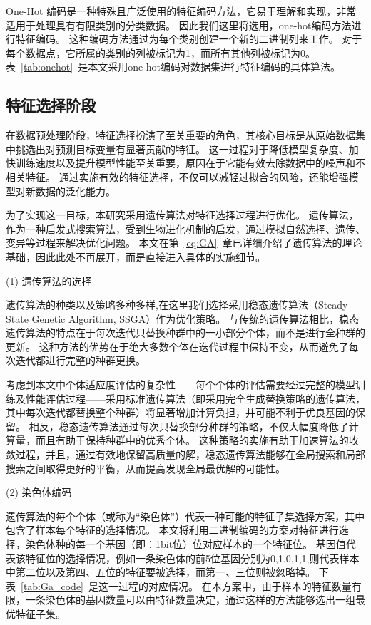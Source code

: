 One-Hot 编码是一种特殊且广泛使用的特征编码方法，它易于理解和实现，非常适用于处理具有有限类别的分类数据。
因此我们这里将选用，one-hot编码方法进行特征编码。
这种编码方法通过为每个类别创建一个新的二进制列来工作。
对于每个数据点，它所属的类别的列被标记为1，而所有其他列被标记为0。
表~\ref{tab:onehot}~是本文采用one-hot编码对数据集进行特征编码的具体算法。


\subsection{特征选择阶段}
在数据预处理阶段，特征选择扮演了至关重要的角色，其核心目标是从原始数据集中挑选出对预测目标变量有显著贡献的特征。
这一过程对于降低模型复杂度、加快训练速度以及提升模型性能至关重要，原因在于它能有效去除数据中的噪声和不相关特征。
通过实施有效的特征选择，不仅可以减轻过拟合的风险，还能增强模型对新数据的泛化能力。

为了实现这一目标，本研究采用遗传算法对特征选择过程进行优化。
遗传算法，作为一种启发式搜索算法，受到生物进化机制的启发，通过模拟自然选择、遗传、变异等过程来解决优化问题。
本文在第~\ref{eq:GA}~章已详细介绍了遗传算法的理论基础，因此此处不再展开，而是直接进入具体的实施细节。\par

(1) 遗传算法的选择\par
遗传算法的种类以及策略多种多样,在这里我们选择采用稳态遗传算法（Steady State Genetic Algorithm, SSGA）作为优化策略。
与传统的遗传算法相比，稳态遗传算法的特点在于每次迭代只替换种群中的一小部分个体，而不是进行全种群的更新。
这种方法的优势在于绝大多数个体在迭代过程中保持不变，从而避免了每次迭代都进行完整的种群更换。\par

考虑到本文中个体适应度评估的复杂性——每个个体的评估需要经过完整的模型训练及性能评估过程——采用标准遗传算法（即采用完全生成替换策略的遗传算法，其中每次迭代都替换整个种群）将显著增加计算负担，并可能不利于优良基因的保留。
相反，稳态遗传算法通过每次只替换部分种群的策略，不仅大幅度降低了计算量，而且有助于保持种群中的优秀个体。
这种策略的实施有助于加速算法的收敛过程，并且，通过有效地保留高质量的解，稳态遗传算法能够在全局搜索和局部搜索之间取得更好的平衡，从而提高发现全局最优解的可能性。

(2) 染色体编码\par

遗传算法的每个个体（或称为“染色体”）代表一种可能的特征子集选择方案，其中包含了样本每个特征的选择情况。
本文将利用二进制编码的方案对特征进行选择，染色体种的每一个基因（即：1bit位）位对应样本的一个特征位。
基因值代表该特征位的选择情况，例如一条染色体的前5位基因分别为{0,1,0,1,1},则代表样本中第二位以及第四、五位的特征要被选择，而第一、三位则被忽略掉。
下表~\ref{tab:Ga_code}~是这一过程的对应情况。
在本方案中，由于样本的特征数量有限，一条染色体的基因数量可以由特征数量决定，通过这样的方法能够选出一组最优特征子集。

